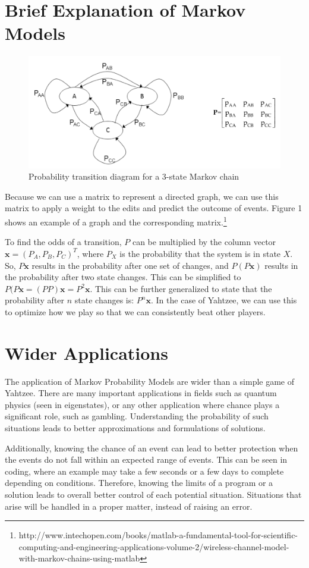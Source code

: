\documentclass[12pt, letterpaper, twoside]{article}
\begin{document}
\section{Brief Explanation of Markov Models}

\begin{figure}
  \includegraphics[width=\linewidth]{image11.jpeg}
  \caption[3-State Markov]{Probability transition diagram for a 3-state Markov chain}
  \label{state}
\end{figure}

Because we can use a matrix to represent a directed graph, we can use this matrix
to apply a weight to the edits and predict the outcome of events. Figure 1
shows an example of a graph and the corresponding matrix.\footnote{http://www.intechopen.com/books/matlab-a-fundamental-tool-for-scientific-computing-and-engineering-applications-volume-2/wireless-channel-model-with-markov-chains-using-matlab}

To find the odds of a transition, $P$ can be multiplied by the column vector
$\mathbf{x}=({P_A, P_B, P_C})^T$, where $P_X$ is the probability that the system
is in state $X$. So, $P\mathbf{x}$ results in the probability after one set
of changes, and $P(P\mathbf{x})$ results in the probability after two state
changes. This can be simplified to $P(P\mathbf{x} = (PP)\mathbf{x} = P^2\mathbf{x}$.
This can be further generalized to state that the probability after $n$ state
changes is: $P^n\mathbf{x}$. In the case of Yahtzee, we can use this to optimize
how we play so that we can consistently beat other players.

\section{Wider Applications}

The application of Markov Probability Models are wider than a simple game
of Yahtzee. There are many important applications in fields such as quantum
physics (seen in eigenstates), or any other application where chance plays a
significant role, such as gambling. Understanding the probability of such
situations leads to better approximations and formulations of solutions.

Additionally, knowing the chance of an event can lead to better protection
when the events do not fall within an expected range of events. This can be
seen in coding, where an example may take a few seconds or a few days to
complete depending on conditions. Therefore, knowing the limits of a program
or a solution leads to overall better control of each potential situation.
Situations that arise will be handled in a proper matter, instead of raising
an error.
\end{document}
